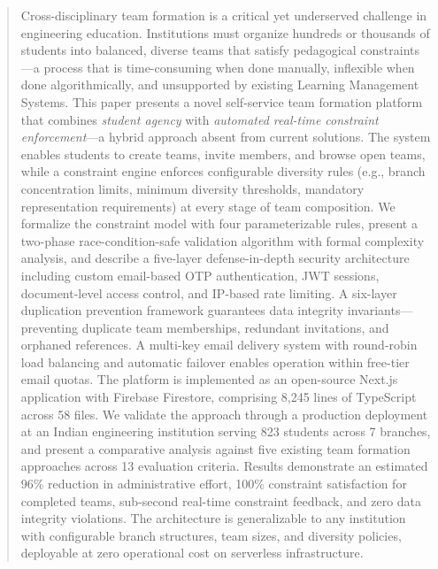 \documentclass[conference]{IEEEtran}
\begin{document}
\begin{abstract}
Cross-disciplinary team formation is a critical yet underserved challenge in engineering education. Institutions must organize hundreds or thousands of students into balanced, diverse teams that satisfy pedagogical constraints---a process that is time-consuming when done manually, inflexible when done algorithmically, and unsupported by existing Learning Management Systems. This paper presents a novel self-service team formation platform that combines \textit{student agency} with \textit{automated real-time constraint enforcement}---a hybrid approach absent from current solutions. The system enables students to create teams, invite members, and browse open teams, while a constraint engine enforces configurable diversity rules (e.g., branch concentration limits, minimum diversity thresholds, mandatory representation requirements) at every stage of team composition. We formalize the constraint model with four parameterizable rules, present a two-phase race-condition-safe validation algorithm with formal complexity analysis, and describe a five-layer defense-in-depth security architecture including custom email-based OTP authentication, JWT sessions, document-level access control, and IP-based rate limiting. A six-layer duplication prevention framework guarantees data integrity invariants---preventing duplicate team memberships, redundant invitations, and orphaned references. A multi-key email delivery system with round-robin load balancing and automatic failover enables operation within free-tier email quotas. The platform is implemented as an open-source Next.js application with Firebase Firestore, comprising 8,245 lines of TypeScript across 58 files. We validate the approach through a production deployment at an Indian engineering institution serving 823 students across 7 branches, and present a comparative analysis against five existing team formation approaches across 13 evaluation criteria. Results demonstrate an estimated 96\% reduction in administrative effort, 100\% constraint satisfaction for completed teams, sub-second real-time constraint feedback, and zero data integrity violations. The architecture is generalizable to any institution with configurable branch structures, team sizes, and diversity policies, deployable at zero operational cost on serverless infrastructure.
\end{abstract}
\end{document}
